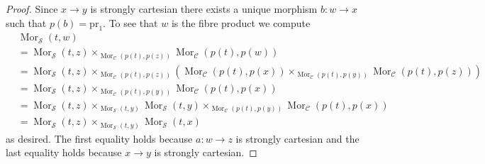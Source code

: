 \documentclass{stacks-project}
\theoremstyle{plain}
\theoremstyle{definition}
\theoremstyle{remark}
\numberwithin{equation}{subsection}
\def\Mor{\mathop{\mathrm{Mor}}\nolimits}
\begin{document}
\begin{proof}
Since $x \to y$ is strongly cartesian there exists a unique morphism
$b : w \to x$ such that $p(b) = \text{pr}_1$. To see that $w$ is the
fibre product we compute
\begin{align*}
& \Mor_\mathcal{S}(t, w) \\
& = \Mor_\mathcal{S}(t, z)
\times_{\Mor_\mathcal{C}(p(t), p(z))}
\Mor_\mathcal{C}(p(t), p(w)) \\
& = \Mor_\mathcal{S}(t, z)
\times_{\Mor_\mathcal{C}(p(t), p(z))}
(\Mor_\mathcal{C}(p(t), p(x))
\times_{\Mor_\mathcal{C}(p(t), p(y))}
\Mor_\mathcal{C}(p(t), p(z))) \\
& = \Mor_\mathcal{S}(t, z)
\times_{\Mor_\mathcal{C}(p(t), p(y))}
\Mor_\mathcal{C}(p(t), p(x)) \\
& = \Mor_\mathcal{S}(t, z)
\times_{\Mor_\mathcal{S}(t, y)}
\Mor_\mathcal{S}(t, y)
\times_{\Mor_\mathcal{C}(p(t), p(y))}
\Mor_\mathcal{C}(p(t), p(x)) \\
& = \Mor_\mathcal{S}(t, z)
\times_{\Mor_\mathcal{S}(t, y)}
\Mor_\mathcal{S}(t, x)
\end{align*}
as desired. The first equality holds because $a : w \to z$ is strongly
cartesian and the last equality holds because $x \to y$ is strongly
cartesian.
\end{proof}
\end{document}
